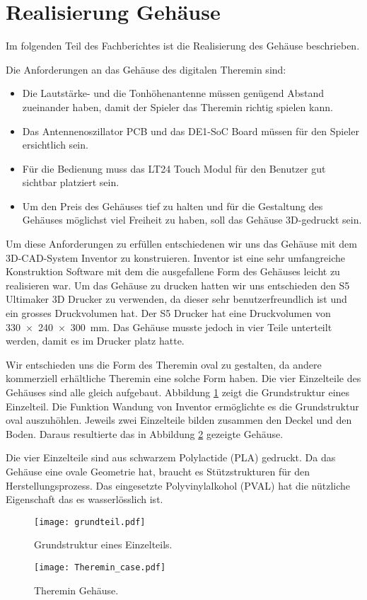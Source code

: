 \clearpage
\section{Realisierung Gehäuse}\label{sec:Realisierung Gehäuse}
Im folgenden Teil des Fachberichtes ist die Realisierung des Gehäuse beschrieben. 

Die Anforderungen an das Gehäuse des digitalen Theremin sind:
\begin{itemize}
	\item Die Lautstärke- und die Tonhöhenantenne müssen genügend Abstand zueinander haben, damit der Spieler das Theremin richtig spielen kann.
	\item Das Antennenoszillator PCB und das DE1-SoC Board müssen für den Spieler ersichtlich sein.
	\item Für die Bedienung muss das LT24 Touch Modul für den Benutzer gut sichtbar platziert sein.
	\item Um den Preis des Gehäuses tief zu halten und für die Gestaltung des Gehäuses möglichst viel Freiheit zu haben, soll das Gehäuse 3D-gedruckt sein.  
\end{itemize}

Um diese Anforderungen zu erfüllen entschiedenen wir uns das Gehäuse mit dem 3D-CAD-System Inventor zu konstruieren. Inventor ist eine sehr umfangreiche Konstruktion Software mit dem die ausgefallene Form des Gehäuses leicht zu realisieren war.
Um das Gehäuse zu drucken hatten wir uns entschieden den S5 Ultimaker 3D Drucker zu verwenden, da dieser sehr benutzerfreundlich ist und ein grosses Druckvolumen hat. 
Der S5 Drucker hat eine Druckvolumen von \SI{330x240x300}{mm}. 
Das Gehäuse musste jedoch in vier Teile unterteilt werden, damit es im Drucker platz hatte. 

Wir entschieden uns die Form des Theremin oval zu gestalten, da andere kommerziell erhältliche Theremin eine solche Form haben. Die vier Einzelteile des Gehäuses sind alle gleich aufgebaut. Abbildung \ref{img:grundteil} zeigt die Grundstruktur eines Einzelteil. Die Funktion Wandung von Inventor ermöglichte es die Grundstruktur oval auszuhöhlen. Jeweils zwei Einzelteile bilden zusammen den Deckel und den Boden. Daraus resultierte das in Abbildung \ref{img:Theremin_case} gezeigte Gehäuse. 

Die vier Einzelteile sind aus schwarzem Polylactide (PLA)  gedruckt. Da das Gehäuse eine ovale Geometrie hat, braucht es Stützstrukturen für den Herstellungsprozess. Das eingesetzte Polyvinylalkohol (PVAL) hat die nützliche Eigenschaft das es wasserlösslich ist.
\begin{figure}[h]
	\centering
	\texttt{[image: grundteil.pdf]}
	\caption{Grundstruktur eines Einzelteils.}
	\label{img:grundteil}
\end{figure}
\begin{figure}[h]
	\centering
	\texttt{[image: Theremin\_case.pdf]}
	\caption{Theremin Gehäuse.}
	\label{img:Theremin_case}
\end{figure}




